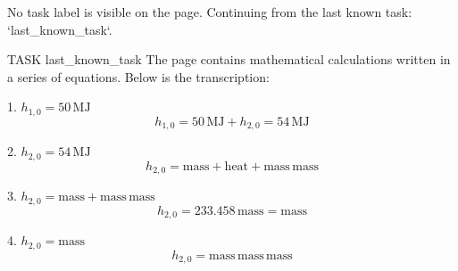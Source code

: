 No task label is visible on the page. Continuing from the last known task: `{last_known_task}`.

TASK {last_known_task}
The page contains mathematical calculations written in a series of equations. Below is the transcription:

1. \( h_{1,0} = 50 \, \text{MJ} \)
   \[
   h_{1,0} = 50 \, \text{MJ} + h_{2,0} = 54 \, \text{MJ}
   \]

2. \( h_{2,0} = 54 \, \text{MJ} \)
   \[
   h_{2,0} = \text{mass} + \text{heat} + \text{mass} \, \text{mass}
   \]

3. \( h_{2,0} = \text{mass} + \text{mass} \, \text{mass} \)
   \[
   h_{2,0} = 233.458 \, \text{mass} = \text{mass}
   \]

4. \( h_{2,0} = \text{mass} \)
   \[
   h_{2,0} = \text{mass} \, \text{mass} \, \text{mass}
   \]

